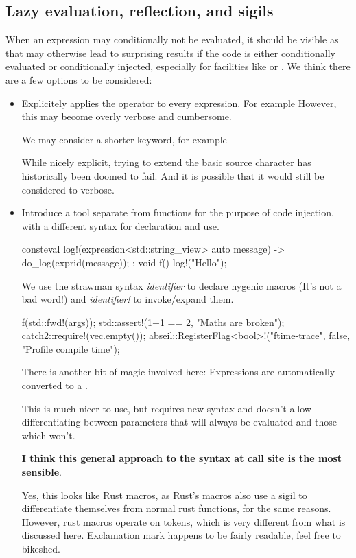 \documentclass{wg21}
\begin{document}
\subsection{Lazy evaluation, reflection, and sigils}

When an expression may conditionally not be evaluated, it should be visible as that may otherwise lead to surprising results
if the code is either conditionally evaluated or conditionally injected, especially for facilities like  or .
We think there are a few options to be considered:

\begin{itemize}
    \item Explicitely applies the  operator to every expression. For example 
    However, this may become overly verbose and cumbersome.
    
    We may consider a shorter keyword, for example 
    
    While nicely explicit, trying to extend the basic source character has historically been doomed to fail. And it is possible that it would still be considered to verbose.
    
    \item Introduce a tool separate from  functions for the purpose of code injection, with a different syntax for declaration and use.
    
\begin{colorblock}
consteval log!(expression<std::string_view> auto message) {
    -> do_log(exprid(message));
};
void f() {
    log!("Hello");
}
\end{colorblock}
     We use the strawman syntax  \emph{identifier}  to declare hygenic macros (It's not a bad word!) and \emph{identifier!}
     to invoke/expand them.
     
\begin{colorblock}
f(std::fwd!(args));
std::assert!(1+1 == 2, "Maths are broken");
catch2::require!(vec.empty());
abseil::RegisterFlag<bool>!("ftime-trace", false, "Profile compile time");
\end{colorblock}

     There is another bit of magic involved here: Expressions are automatically converted to a .
     
     This is much nicer to use, but requires new syntax and doesn't allow differentiating between parameters that will always be evaluated and those which won't.
     
     \textbf{I think this general approach to the syntax at call site is the most sensible}.
   
\begin{note}
Yes, this looks like Rust macros, as Rust's macros also use a sigil to differentiate themselves from normal rust functions,
for the same reasons. However, rust macros operate on tokens, which is very different from what is discussed here.
Exclamation mark \tcode{!} happens to be fairly readable, feel free to bikeshed.
\end{note}
     
\end{itemize}
\end{document}
